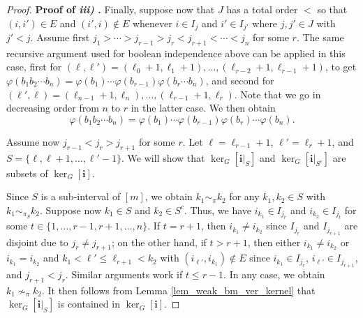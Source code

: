 \documentclass[a4paper,12pt]{extarticle}
\theoremstyle{definition}
\theoremstyle{remark}
\begin{document}
\begin{proof}
	
	\noindent \textbf{Proof of \emph{iii)}
		.} Finally, suppose now that $J$ has a total order $<$ so that $(i,i') \in E$ and $(i',i) \notin E$  whenever $i \in I_{j}$ and $i' \in I_{j'}$ where $j,j' \in J$ with $j' < j$. 
	Assume first $ j_1 > \cdots > j_{r-1} > j_r < j_{r+1} < \cdots < j_n$ for some $r$. 
	The same recursive argument used for boolean independence above can be applied in this case, first for $(\ell,\ell') =(\ell_0+1,\ell_1+1),\ldots,(\ell_{r-2}+1,\ell_{r-1}+1)$, to get $\varphi(b_1 b_2 \cdots b_n)  = \varphi(b_1)  \cdots \varphi(b_{r-1}) \varphi(b_r \cdots b_n)$, and second for $(\ell',\ell) =(\ell_{n-1}+1,\ell_n),\ldots,(\ell_{r-1}+1,\ell_{r})$.
	Note that we go in decreasing order from $n$ to $r$ in the latter case. 
	We then obtain $$\varphi(b_1 b_2 \cdots b_n)  = \varphi(b_1)  \cdots \varphi(b_{r-1}) \varphi(b_r)  \cdots \varphi(b_n).$$ 
	
	Assume now $j_{r-1} < j_r > j_{r+1}$ for some $r$. 
	Let $\ell = \ell_{r-1}+1$, $\ell' = \ell_r+1$, and $S = \{ \ell, \ell+1, \ldots, \ell'-1 \}$. 
	We will show that $\ker_G[\bm{i}|_S]$ and $\ker_G[\bm{i}|_{S^c}]$ are subsets of $\ker_G[\bm{i}]$. 
	
	Since $S$ is a sub-interval of $[m]$, we obtain $k_1 \sim_{\pi} k_2$ for any $k_1,k_2 \in S$ with  $k_1 \sim_{\pi_S} k_2$. 
	Suppose now $k_1 \in S$ and $k_2 \in S^c$. 
	Thus, we have $i_{k_1} \in I_{j_r}$ and $i_{k_2} \in I_{j_t}$ for some $ t \in \{1,\ldots,r-1,r+1,\ldots,n\}$.    
	If $t=r+1$, then $i_{k_1} \neq i_{k_2}$ since $I_{j_r}$ and $I_{j_{r+1}}$ are disjoint due to $j_r \neq j_{r+1}$;
	on the other hand, if $t>r+1$, then either $i_{k_1} \neq i_{k_2}$ or $i_{k_1} = i_{k_2}$ and $k_1 < \ell' \leq \ell_{r+1} < k_2$ with  $(i_{\ell'},i_{k_1}) \notin E$ since $i_{k_1} \in I_{j_r}$, $i_{\ell'} \in I_{j_{r+1}}$, and $j_{r+1} < j_{r}$. 
	Similar arguments work if $t \leq r-1$. 
	In any case, we obtain $k_1 \nsim_{\pi} k_2$. 
	It then follows from Lemma \ref{lem_weak_bm_ver_kernel} that $\ker_G[\bm{i}|_S]$ is contained in $\ker_G[\bm{i}]$. 
	

\end{proof}
\end{document}

